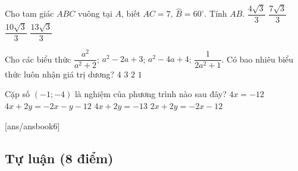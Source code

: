 \begin{ex}
Cho tam giác $ABC$ vuông tại $A$, biết $AC=7$, $\widehat{B}=60^\circ$. Tính $AB$.
\choice
{$\dfrac{4\sqrt{3}}{3}$}
{\True $\dfrac{7\sqrt{3}}{3}$}
{$\dfrac{10\sqrt{3}}{3}$}
{$\dfrac{13\sqrt{3}}{3}$}
\end{ex}

\begin{ex}
Cho các biểu thức $\dfrac{a^2}{a^2+2}$; $a^2-2a+3$; $a^2-4a+4$; $\dfrac{1}{2a^2+1}$. Có bao nhiêu biểu thức luôn nhận giá trị dương?
\choice
{$4$}
{$3$}
{\True $2$}
{$1$}
\end{ex}

\begin{ex}
Cặp số $(-1;-4)$ là nghiệm của phương trình nào sau đây?
\choice
{$4x=-12$}
{$4x+2y=-2x-y-12$}
{$4x+2y=-13$}
{\True $2x+2y=-2x-12$}
\end{ex}


[ans/ansbook6]


\setcounter{bt}{0}
\subsection{Tự luận (8 điểm)}




